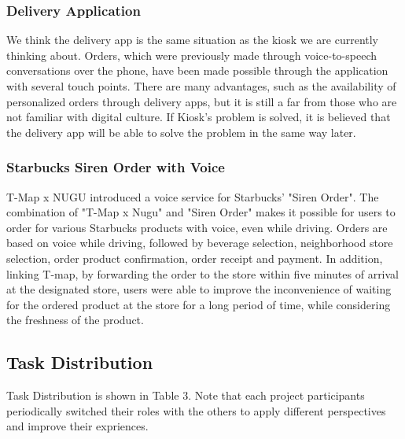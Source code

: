 \documentclass[conference,compsoc]{IEEEtran}
\begin{document}
\subsubsection{Delivery Application}
We think the delivery app is the same situation as the kiosk we are currently thinking about. Orders, which were previously made through voice-to-speech conversations over the phone, have been made possible through the application with several touch points. There are many advantages, such as the availability of personalized orders through delivery apps, but it is still a far from those who are not familiar with digital culture. If Kiosk's problem is solved, it is believed that the delivery app will be able to solve the problem in the same way later.

\subsubsection{Starbucks Siren Order with Voice}
T-Map x NUGU introduced a voice service for Starbucks' "Siren Order". The combination of "T-Map x Nugu" and "Siren Order" makes it possible for users to order for various Starbucks products with voice, even while driving. Orders are based on voice while driving, followed by beverage selection, neighborhood store selection, order product confirmation, order receipt and payment. In addition, linking T-map, by forwarding the order to the store within five minutes of arrival at the designated store, users were able to improve the inconvenience of waiting for the ordered product at the store for a long period of time, while considering the freshness of the product.

\subsection{Task Distribution}

Task Distribution is shown in Table 3. Note that each project participants periodically switched their roles with the others to apply different perspectives and improve their expriences.
\end{document}
